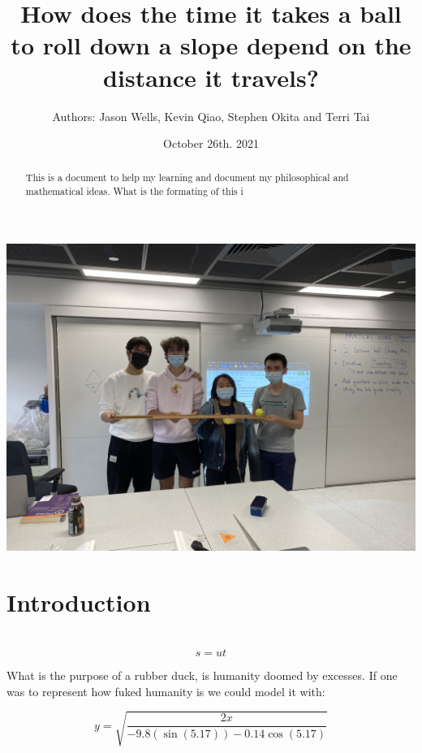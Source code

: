 \documentclass{article}
\begin{document}
  \begin{titlepage}
  \title{How does the time it takes a ball to roll down a slope depend on the distance it travels?}
  \maketitle
  \author{Authors: Jason Wells, Kevin Qiao, Stephen Okita and Terri Tai}
  \date{October 26th. 2021}
  \centering
  \includegraphics[width=14cm]{theTeam.jpg} %
  \end{titlepage}

\tableofcontents

\section{Introduction}
​   \[s = ut\]
\begin{abstract}
This is a document to help my learning and document my philosophical and mathematical ideas. What is the formating of this i
\end{abstract}

\begin{center}
What is the purpose of a rubber duck, is humanity doomed by excesses. If one was to represent how fuked humanity is we could model it with: 
\end{center}
\[ y = \sqrt{\frac{2x}{-9.8(\sin(5.17))-0.14\cos(5.17)}}\]
\end{document}
